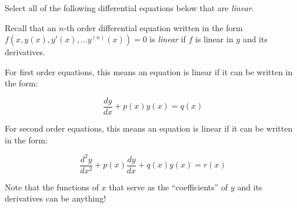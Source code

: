 \documentclass{ximera}
\author{Jim Talamo}
\begin{document}
\begin{exercise}
Select all of the following differential equations below that are \emph{linear}.

\begin{selectAll}
\end{selectAll}

\begin{hint}
Recall that an $n$-th order differential equation written in the form $f(x,y(x),y'(x), \ldots y^{(n)}(x))=0$ is \emph{linear} if $f$ is linear in $y$ and its derivatives. 

For first order equations, this means an equation is linear if it can be written in the form:

\[
\frac{dy}{dx}+p(x)y(x)=q(x)
\]


For second order equations, this means an equation is linear if it can be written in the form:

\[
\frac{d^2y}{dx^2}+p(x)\frac{dy}{dx}+q(x)y(x)=r(x)
\]

Note that the functions of $x$ that serve as the ``coefficients'' of $y$ and its derivatives can be anything!
\end{hint}
\end{exercise}
\end{document}
